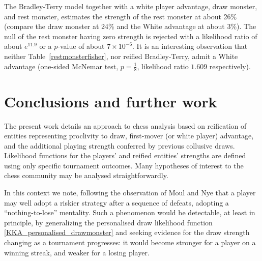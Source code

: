 \documentclass[review]{elsarticle}
\begin{document}
\begin{table}
  \caption{Results for the 25 won games (out of 49 played) in
    Cura\c{c}ao 1962 between rested and unrested
    players \label{restmonsterfisher}} \centering {}
\end{table}

The Bradley-Terry model together with a white
  player advantage, draw monster, and rest monster, estimates the
  strength of the rest monster at about 26\% (compare the draw monster
  at 24\% and the White advantage at about 3\%).  The null of the rest
  monster having zero strength is rejected with a likelihood ratio of
  about $e^{11.9}$ or a $p$-value of about $7\times 10^{-6}$.  It is
  an interesting observation that neither
  Table~\ref{restmonsterfisher}, nor reified Bradley-Terry, admit a
  White advantage (one-sided McNemar test, $p=\frac{1}{8}$, likelihood
  ratio $1.609$ respectively).

\section{Conclusions and further work}

The present work details an approach to chess analysis based on
reification of entities representing proclivity to draw, first-mover
(or white player) advantage, and the additional
  playing strength conferred by previous collusive draws.  Likelihood
  functions for the players' and reified entities' strengths are
  defined using only specific tournament outcomes.  Many hypotheses
of interest to the chess community may be analysed straightforwardly.

In this context we note, following the observation of Moul and Nye
that a player may well adopt a riskier strategy after a sequence of
defeats, adopting a ``nothing-to-lose'' mentality.  Such a phenomenon
would be detectable, at least in principle, by generalizing the
personalised draw likelihood function
\ref{KKA_personalised_drawmonster} and seeking evidence for the draw
strength changing as a tournament progresses: it would become stronger
for a player on a winning streak, and weaker for a losing player.
\end{document}
